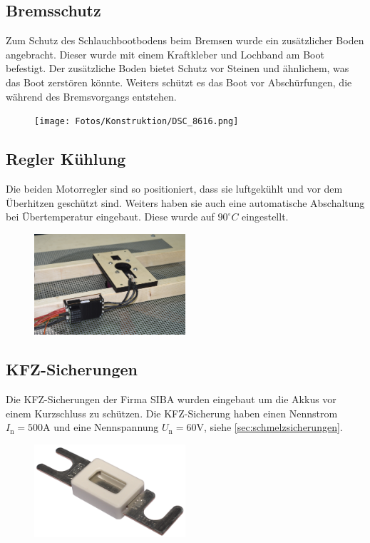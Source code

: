 \subsection{Bremsschutz}
Zum Schutz des Schlauchbootbodens beim Bremsen wurde ein zusätzlicher Boden angebracht. Dieser wurde mit einem Kraftkleber und Lochband am Boot befestigt. 
Der zusätzliche Boden bietet Schutz vor Steinen und ähnlichem, was das Boot zerstören könnte. Weiters schützt es das Boot 
vor Abschürfungen, die während des Bremsvorgangs entstehen. 

\begin{figure}[h]
    \centering
    \texttt{[image: Fotos/Konstruktion/DSC\_8616.png]}
\end{figure}


\subsection{Regler Kühlung}
Die beiden Motorregler sind so positioniert, dass sie luftgekühlt und vor dem Überhitzen geschützt sind. Weiters haben sie auch eine automatische Abschaltung bei Übertemperatur
eingebaut. Diese wurde auf $90^\circ C$ eingestellt. 

\begin{figure}[h]
    \centering
    \includegraphics[width=0.5\textwidth]{Fotos/Gitter_unten.jpg}
\end{figure}

\subsection{KFZ-Sicherungen}
Die KFZ-Sicherungen der Firma SIBA wurden eingebaut um die Akkus vor einem Kurzschluss zu schützen. Die KFZ-Sicherung haben einen Nennstrom $I_\mathrm{n} = 500\mathrm{A}$
und eine Nennspannung $U_\mathrm{n} = 60 \mathrm{V}$, siehe \autoref{sec:schmelzsicherungen}.

\begin{figure}[h]
    \centering
    \includegraphics[width=0.5\textwidth]{Fotos/kfz_Sicherung.png}
\end{figure}
